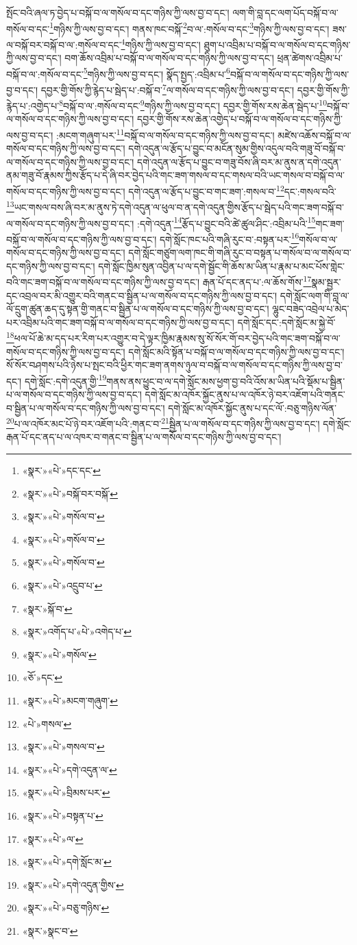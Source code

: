 སྤོང་བའི་ཞལ་ཏ་བྱེད་པ་བསྐོ་བ་ལ་གསོལ་བ་དང་གཉིས་ཀྱི་ལས་བྱ་བ་དང་། ལག་གི་བླ་དང་ལག་པོད་བསྐོ་བ་ལ་གསོལ་བ་དང་\footnote{«སྣར་»«པེ་»དང་དང་}གཉིས་ཀྱི་ལས་བྱ་བ་དང་། གནས་ཁང་བསྐོ་\footnote{«སྣར་»«པེ་»བསྐོ་བར་བསྐོ་}བ་ལ་:གསོལ་བ་དང་\footnote{«སྣར་»«པེ་»གསོལ་བ་}གཉིས་ཀྱི་ལས་བྱ་བ་དང་། ཟས་ལ་བསྐོ་བར་བསྐོ་བ་ལ་:གསོལ་བ་དང་\footnote{«སྣར་»«པེ་»གསོལ་བ་}གཉིས་ཀྱི་ལས་བྱ་བ་དང་། ཐུག་པ་འབྲིམ་པ་བསྐོ་བ་ལ་གསོལ་བ་དང་གཉིས་ཀྱི་ལས་བྱ་བ་དང་། བག་ཆོས་འབྲིམ་པ་བསྐོ་བ་ལ་གསོལ་བ་དང་གཉིས་ཀྱི་ལས་བྱ་བ་དང་། ཕྲན་ཚེགས་འབྲིམ་པ་བསྐོ་བ་ལ་:གསོལ་བ་དང་\footnote{«སྣར་»«པེ་»གསོལ་བ་}གཉིས་ཀྱི་ལས་བྱ་བ་དང་། སྣོད་སྤྱད་:འབྲིམ་པ་\footnote{«སྣར་»«པེ་»འདྲུབ་པ་}བསྐོ་བ་ལ་གསོལ་བ་དང་གཉིས་ཀྱི་ལས་བྱ་བ་དང་། དབྱར་གྱི་གོས་ཀྱི་རྙེད་པ་སྦེད་པ་:བསྐོ་བ་\footnote{«སྣར་»སྐོ་བ་}ལ་གསོལ་བ་དང་གཉིས་ཀྱི་ལས་བྱ་བ་དང་། དབྱར་གྱི་གོས་ཀྱི་རྙེད་པ་:འགྱེད་པ་\footnote{«སྣར་»འགོད་པ་«པེ་»འགེད་པ་}བསྐོ་བ་ལ་:གསོལ་བ་དང་\footnote{«སྣར་»«པེ་»གསོལ་}གཉིས་ཀྱི་ལས་བྱ་བ་དང་། དབྱར་གྱི་གོས་རས་ཆེན་སྦེད་པ་\footnote{«ཅོ་»དང་}བསྐོ་བ་ལ་གསོལ་བ་དང་གཉིས་ཀྱི་ལས་བྱ་བ་དང་། དབྱར་གྱི་གོས་རས་ཆེན་འགྱེད་པ་བསྐོ་བ་ལ་གསོལ་བ་དང་གཉིས་ཀྱི་ལས་བྱ་བ་དང་། :མངག་གཞུག་པར་\footnote{«སྣར་»«པེ་»མངག་གཞུག་}བསྐོ་བ་ལ་གསོལ་བ་དང་གཉིས་ཀྱི་ལས་བྱ་བ་དང་། མཛེས་འཆོས་བསྐོ་བ་ལ་གསོལ་བ་དང་གཉིས་ཀྱི་ལས་བྱ་བ་དང་། དགེ་འདུན་ལ་རྩོད་པ་བྱུང་བ་མངོན་སུམ་གྱིས་འདུལ་བའི་གཟུ་བོ་བསྐོ་བ་ལ་གསོལ་བ་དང་གཉིས་ཀྱི་ལས་བྱ་བ་དང་། དགེ་འདུན་ལ་རྩོད་པ་བྱུང་བ་གཟུ་བོས་ཞི་བར་མ་ནུས་ན་དགེ་འདུན་ནམ་གཟུ་བོ་རྣམས་ཀྱིས་རྩོད་པ་དེ་ཞི་བར་བྱེད་པའི་གང་ཟག་གསལ་བ་དང་གསལ་བའི་ཡང་གསལ་བ་བསྐོ་བ་ལ་གསོལ་བ་དང་གཉིས་ཀྱི་ལས་བྱ་བ་དང་། དགེ་འདུན་ལ་རྩོད་པ་བྱུང་བ་གང་ཟག་:གསལ་བ་\footnote{«པེ་»གསལ་}དང་:གསལ་བའི་\footnote{«སྣར་»«པེ་»གསལ་བ་}ཡང་གསལ་བས་ཞི་བར་མ་ནུས་ཏེ་དགེ་འདུན་ལ་ཕུལ་བ་ན་དགེ་འདུན་གྱིས་རྩོད་པ་སྦེད་པའི་གང་ཟག་བསྐོ་བ་ལ་གསོལ་བ་དང་གཉིས་ཀྱི་ལས་བྱ་བ་དང་། :དགེ་འདུན་\footnote{«སྣར་»«པེ་»དགེ་འདུན་ལ་}རྩོད་པ་བྱུང་བའི་ཚེ་ཚུལ་ཤིང་:འབྲིམ་པའི་\footnote{«སྣར་»«པེ་»བྲིམས་པར་}གང་ཟག་བསྐོ་བ་ལ་གསོལ་བ་དང་གཉིས་ཀྱི་ལས་བྱ་བ་དང་། དགེ་སློང་ཁང་པའི་གཞི་རུང་བ་:བསྟན་པར་\footnote{«སྣར་»«པེ་»བསྟན་པ་}གསོལ་བ་ལ་གསོལ་བ་དང་གཉིས་ཀྱི་ལས་བྱ་བ་དང་། དགེ་སློང་གཙུག་ལག་ཁང་གི་གཞི་རུང་བ་བསྟན་པ་གསོལ་བ་ལ་གསོལ་བ་དང་གཉིས་ཀྱི་ལས་བྱ་བ་དང་། དགེ་སློང་ཁྱིམ་སུན་འབྱིན་པ་ལ་དགེ་སྦྱོང་གི་ཆོས་མ་ཡིན་པ་རྣམ་པ་མང་པོས་གླེང་བའི་གང་ཟག་བསྐོ་བ་ལ་གསོལ་བ་དང་གཉིས་ཀྱི་ལས་བྱ་བ་དང་། རྒན་པོ་དང་ནད་པ་:ལ་ཆོས་གོས་\footnote{«སྣར་»«པེ་»ལ་}སྣམ་སྦྱར་དང་འབྲལ་བར་མི་འགྱུར་བའི་གནང་བ་སྦྱིན་པ་ལ་གསོལ་བ་དང་གཉིས་ཀྱི་ལས་བྱ་བ་དང་། དགེ་སློང་ལག་གི་བླ་ལ་ལོ་དྲུག་ཚུན་ཆད་དུ་སྟན་གྱི་གནང་བ་སྦྱིན་པ་ལ་གསོལ་བ་དང་གཉིས་ཀྱི་ལས་བྱ་བ་དང་། ལྷུང་བཟེད་འབྲེལ་པ་མེད་པར་འབྲིམ་པའི་གང་ཟག་བསྐོ་བ་ལ་གསོལ་བ་དང་གཉིས་ཀྱི་ལས་བྱ་བ་དང་། དགེ་སློང་དང་:དགེ་སློང་མ་སྐྱེ་བོ་\footnote{«སྣར་»«པེ་»དགེ་སློང་མ་}ཕལ་པོ་ཆེ་མ་དད་པར་རིག་པར་འགྱུར་བ་དེ་ལྟར་ཁྱིམ་རྣམས་སུ་སོ་སོར་གོ་བར་བྱེད་པའི་གང་ཟག་བསྐོ་བ་ལ་གསོལ་བ་དང་གཉིས་ཀྱི་ལས་བྱ་བ་དང་། དགེ་སློང་མའི་སྟོན་པ་བསྐོ་བ་ལ་གསོལ་བ་དང་གཉིས་ཀྱི་ལས་བྱ་བ་དང་། སོ་སོར་བཤགས་པའི་ཉེས་པ་སྤང་བའི་ཕྱིར་གང་ཟག་ནགས་ཉུལ་བ་བསྐོ་བ་ལ་གསོལ་བ་དང་གཉིས་ཀྱི་ལས་བྱ་བ་དང་། དགེ་སློང་:དགེ་འདུན་གྱི་\footnote{«སྣར་»«པེ་»དགེ་འདུན་གྱིས་}གནས་ནས་ཕྱུང་བ་ལ་དགེ་སློང་མས་ཕྱག་བྱ་བའི་འོས་མ་ཡིན་པའི་སྡོམ་པ་སྦྱིན་པ་ལ་གསོལ་བ་དང་གཉིས་ཀྱི་ལས་བྱ་བ་དང་། དགེ་སློང་མ་འཁོར་སྐྱོང་ནུས་པ་ལ་འཁོར་ཉེ་བར་འཇོག་པའི་གནང་བ་སྦྱིན་པ་ལ་གསོལ་བ་དང་གཉིས་ཀྱི་ལས་བྱ་བ་དང་། དགེ་སློང་མ་འཁོར་སྐྱོང་ནུས་པ་དང་ལོ་:བཅུ་གཉིས་ལོན་\footnote{«སྣར་»«པེ་»བཅུ་གཉིས་}པ་ལ་འཁོར་མང་པོ་ཉེ་བར་འཇོག་པའི་:གནང་བ་\footnote{«སྣར་»སྣང་བ་}སྦྱིན་པ་ལ་གསོལ་བ་དང་གཉིས་ཀྱི་ལས་བྱ་བ་དང་། དགེ་སློང་རྒན་པོ་དང་ནད་པ་ལ་འཁར་བ་གནང་བ་སྦྱིན་པ་ལ་གསོལ་བ་དང་གཉིས་ཀྱི་ལས་བྱ་བ་དང་། 